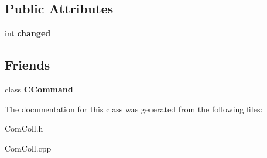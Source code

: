 \subsection*{Public Attributes}
\begin{DoxyCompactItemize}
\item 
\hypertarget{class_c_com_coll_a607c637a26818582e9ba8e664239aa1c}{int {\bfseries changed}}\label{class_c_com_coll_a607c637a26818582e9ba8e664239aa1c}

\end{DoxyCompactItemize}
\subsection*{Friends}
\begin{DoxyCompactItemize}
\item 
\hypertarget{class_c_com_coll_a65ee4ce9d37a3f787b15388dec422397}{class {\bfseries C\-Command}}\label{class_c_com_coll_a65ee4ce9d37a3f787b15388dec422397}

\end{DoxyCompactItemize}


The documentation for this class was generated from the following files\-:\begin{DoxyCompactItemize}
\item 
Com\-Coll.\-h\item 
Com\-Coll.\-cpp\end{DoxyCompactItemize}
